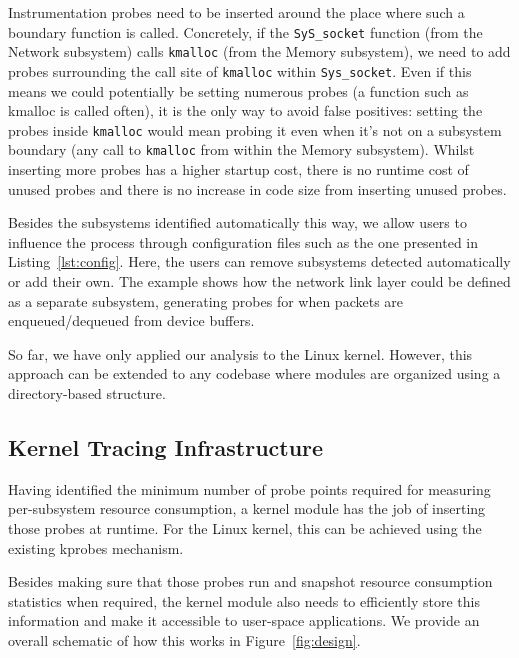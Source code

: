 \documentclass[letterpaper,twocolumn,10pt]{article}
\begin{document}
Instrumentation probes need to be inserted around the place where such a boundary
function is called. Concretely, if the \texttt{SyS\_socket} function (from the
Network subsystem) calls \texttt{kmalloc} (from the Memory subsystem), we need
to add probes surrounding the call site of \texttt{kmalloc} within
\texttt{Sys\_socket}. Even if this means we could potentially be setting
numerous probes (a function such as kmalloc is called often), it is the
only way to avoid false positives: setting the probes inside \texttt{kmalloc}
would mean probing it even when it's not on a subsystem boundary (any call to
\texttt{kmalloc} from within the Memory subsystem). Whilst inserting more probes
has a higher startup cost, there is no runtime cost of unused probes and there
is no increase in code size from inserting unused probes.

Besides the subsystems identified automatically this way, we allow users to
influence the process through configuration files such as the one presented in
Listing~\ref{lst:config}. Here, the users can remove subsystems detected
automatically or add their own. The example shows how the network link layer
could be defined as a separate subsystem, generating probes for when packets are
enqueued/dequeued from device buffers.

So far, we have only applied our analysis to the Linux kernel. However, this
approach can be extended to any codebase where modules are organized using a
directory-based structure.


\subsection{Kernel Tracing Infrastructure}

Having identified the minimum number of probe points required for measuring per-subsystem
resource consumption, a kernel module has the job of inserting those probes at runtime.
For the Linux kernel, this can be achieved using the existing kprobes mechanism.

Besides making sure that those probes run and snapshot resource consumption statistics
when required, the kernel module also needs to efficiently store this information
and make it accessible to user-space applications. We provide an overall schematic of
how this works in Figure~\ref{fig:design}.
\end{document}
